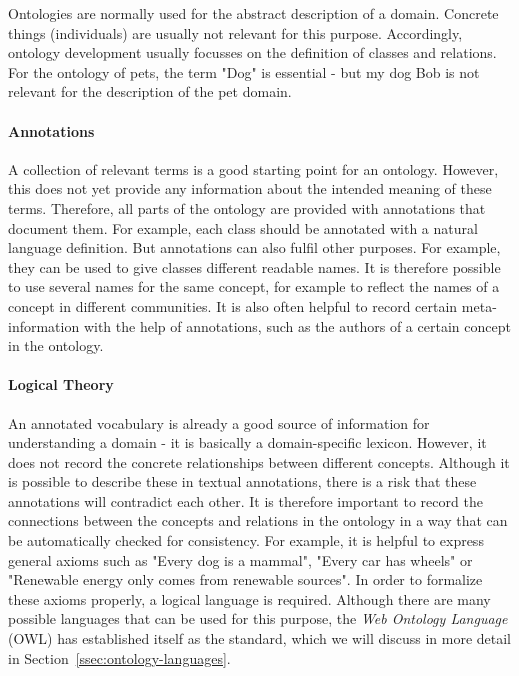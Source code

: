 Ontologies are normally used for the abstract description of a domain. Concrete things (individuals) are usually not relevant for this purpose. Accordingly, ontology development usually focusses on the definition of classes and relations. For the ontology of pets, the term "Dog" is essential - but my dog Bob is not relevant for the description of the pet domain.

\paragraph{Annotations}

A collection of relevant terms is a good starting point for an ontology. However, this does not yet provide any information about the intended meaning of these terms. Therefore, all parts of the ontology are provided with annotations that document them. For example, each class should be annotated with a natural language definition. But annotations can also fulfil other purposes. For example, they can be used to give classes different readable names. It is therefore possible to use several names for the same concept, for example to reflect the names of a concept in different communities. It is also often helpful to record certain meta-information with the help of annotations, such as the authors of a certain concept in the ontology.

\paragraph{Logical Theory} 

An annotated vocabulary is already a good source of information for understanding a domain - it is basically a domain-specific lexicon. However, it does not record the concrete relationships between different concepts. Although it is possible to describe these in textual annotations, there is a risk that these annotations will contradict each other. It is therefore important to record the connections between the concepts and relations in the ontology in a way that can be automatically checked for consistency. For example, it is helpful to express general axioms such as "Every dog is a mammal", "Every car has wheels" or "Renewable energy only comes from renewable sources". In order to formalize these axioms properly, a logical language is required. Although there are many possible languages that can be used for this purpose, the \textit{Web Ontology Language} (OWL) has established itself as the standard, which we will discuss in more detail in Section~\ref{ssec:ontology-languages}.


